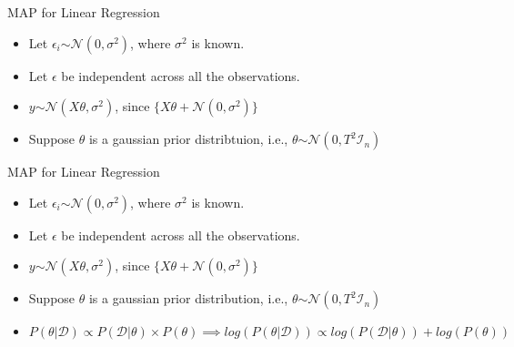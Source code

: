 \documentclass{beamer}
\begin{document}
\begin{frame}{MAP for Linear Regression}

\begin{itemize}
    \item Let $\epsilon_i \stackrel{}{\sim} \mathcal{N}(0, \sigma^{2})$, where $\sigma^{2}$ is known.
    \item Let $\epsilon$ be independent across all the observations.
    \item $y \stackrel{}{\sim} \mathcal{N}(X\theta, \sigma^{2})$, since $\{ X\theta + \mathcal{N}(0, \sigma^{2})\}$ 
    \item Suppose $\theta$ is a gaussian prior distribtuion, i.e., $\theta \stackrel{}{\sim} \mathcal{N}(0, T^{2}\mathcal{I}_n)$

\end{itemize}
    
\end{frame}

\begin{frame}{MAP for Linear Regression}

\begin{itemize}
    \item Let $\epsilon_i \stackrel{}{\sim} \mathcal{N}(0, \sigma^{2})$, where $\sigma^{2}$ is known.
    \item Let $\epsilon$ be independent across all the observations.
    \item $y \stackrel{}{\sim} \mathcal{N}(X\theta, \sigma^{2})$, since $\{ X\theta + \mathcal{N}(0, \sigma^{2})\}$ 
    \item Suppose $\theta$ is a gaussian prior distribution, i.e., $\theta \stackrel{}{\sim} \mathcal{N}(0, T^{2}\mathcal{I}_n)$
    \item $P(\theta | \mathcal{D}) \propto P(\mathcal{D} | \theta) \times P(\theta) \implies log(P(\theta | \mathcal{D})) \propto log(P(\mathcal{D} | \theta)) + log(P(\theta))$
\end{itemize}

    
\end{frame}
\end{document}
